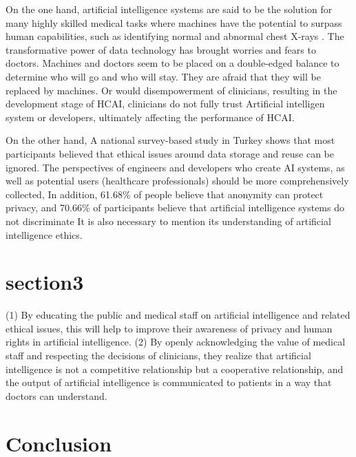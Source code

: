 \documentclass[paper=a4, fontsize=11pt]{scrartcl} %
\numberwithin{equation}{section} %
\numberwithin{figure}{section} %
\numberwithin{table}{section} %
\begin{document}
On the one hand, artificial intelligence systems are said to be the solution for many highly skilled medical tasks 
where machines have the potential to surpass human capabilities, such as identifying normal and abnormal chest X-rays \cite{iniestaHumanRoleGuarantee2023}.
The transformative power of data technology has brought worries and fears to doctors. Machines and 
doctors seem to be placed on a double-edged balance to determine who will go and who will stay. 
They are afraid that they will be replaced by machines.
Or would disempowerment of clinicians, resulting in the development stage of HCAI, 
clinicians do not fully trust Artificial intelligen system or developers, ultimately affecting the performance of HCAI.


On the other hand, A national survey-based study in Turkey shows that most participants believed that ethical issues around data storage 
and reuse can be ignored. The perspectives of engineers and developers who create AI systems, as well as potential users (healthcare professionals) 
should be more comprehensively collected, In addition, 61.68\% of people believe that anonymity can protect privacy, 
and 70.66\% of participants believe that artificial intelligence systems do not discriminate \cite{ahunPerceptionsConcernsEmergency2023}
It is also necessary to mention its understanding of artificial intelligence ethics.




\section{section3}
(1) By educating the public and medical staff on artificial intelligence and related ethical issues, this will help 
to improve their awareness of privacy and human rights in artificial intelligence.
(2) By openly acknowledging the value of medical staff and respecting the decisions of clinicians, they realize that 
artificial intelligence is not a competitive relationship but a cooperative relationship, and the output of artificial 
intelligence is communicated to patients in a way that doctors can understand.

\section{Conclusion}
\end{document}
